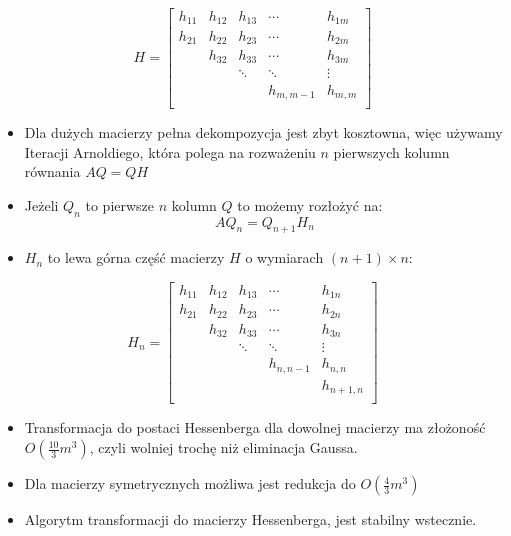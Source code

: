 \documentclass[a4paper]{article}
\begin{document}
\begin{equation*}
    H = 
    \begin{bmatrix}
        h_{11} & h_{12} & h_{13} & \cdots & h_{1m} \\
        h_{21} & h_{22} & h_{23} & \cdots & h_{2m} \\
        & h_{32} & h_{33} & \cdots & h_{3m} \\
        & & \ddots & \ddots & \vdots \\
        & & & h_{m,m-1} & h_{m,m} \\
    \end{bmatrix}
\end{equation*}

\begin{itemize}
    \item Dla dużych macierzy pełna dekompozycja jest zbyt kosztowna, więc używamy Iteracji Arnoldiego, która polega na rozważeniu $n$ pierwszych kolumn równania $AQ = QH$
    \item Jeżeli $Q_n$ to pierwsze $n$ kolumn $Q$ to możemy rozłożyć na:
    \begin{equation*}
        A Q_n = Q_{n+1} H_n
    \end{equation*}
    \item $H_n$ to lewa górna część macierzy $H$ o wymiarach $(n+1) \times n$:
\end{itemize}
\begin{equation*}
    H_n = 
    \begin{bmatrix}
        h_{11} & h_{12} & h_{13} & \cdots & h_{1n} \\
        h_{21} & h_{22} & h_{23} & \cdots & h_{2n} \\
        & h_{32} & h_{33} & \cdots & h_{3n} \\
        & & \ddots & \ddots & \vdots \\
        & & & h_{n,n-1} & h_{n,n} \\
        & & & & h_{n+1,n} \\
    \end{bmatrix}
\end{equation*}
\begin{itemize}
    \item Transformacja do postaci Hessenberga dla dowolnej macierzy ma złożoność $O(\frac{10}{3}m^3)$, czyli wolniej trochę niż eliminacja Gaussa.
    \item Dla macierzy symetrycznych możliwa jest redukcja do $O(\frac{4}{3}m^3)$
    \item Algorytm transformacji do macierzy Hessenberga, jest stabilny wstecznie.
\end{itemize}
\end{document}
